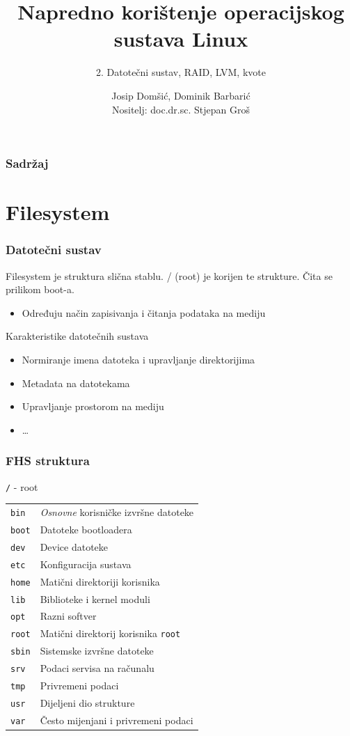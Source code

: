 \documentclass[t]{beamer}
\date{\todayiso}
\title[NKOSL]{Napredno korištenje operacijskog sustava Linux}
\author[Josip Domšić, Dominik Barbarić]{Josip Domšić, Dominik Barbarić\\ {\small Nositelj: doc.dr.sc. Stjepan Groš}}
\subtitle{2. Datotečni sustav, RAID, LVM, kvote}
\institute[FER]{Sveučilište u Zagrebu\\Fakultet elektrotehnike i računarstva}
\begin{document}
{
	\begin{frame}
		\maketitle
	\end{frame}
}

\begin{frame}
	\frametitle{Sadržaj}
	\tableofcontents
\end{frame}

\section{Filesystem}
\begin{frame}
	\frametitle{Datotečni sustav}
    Filesystem je struktura slična stablu. / (root) je korijen te strukture. Čita se prilikom boot-a.

	\begin{itemize}
		\item Određuju način zapisivanja i čitanja podataka na mediju
	\end{itemize}
	Karakteristike datotečnih sustava
	\begin{itemize}
		\item Normiranje imena datoteka i upravljanje direktorijima
		\item Metadata na datotekama
		\item Upravljanje prostorom na mediju
		\item \dots
    \end{itemize}
\end{frame}

\begin{frame}
	\frametitle{FHS struktura}
	\texttt{/} - root\\
	\begin{tabular}{p{3cm} l}
		\texttt{bin} & \emph{Osnovne} korisničke izvršne datoteke \\
		\texttt{boot} & Datoteke bootloadera \\
		\texttt{dev} & Device datoteke \\
		\texttt{etc} & Konfiguracija sustava \\
		\texttt{home} & Matični direktoriji korisnika \\
		\texttt{lib} & Biblioteke i kernel moduli \\
		\texttt{opt} & Razni softver \\
		\texttt{root} & Matični direktorij korisnika \texttt{root} \\
		\texttt{sbin} & Sistemske izvršne datoteke \\
		\texttt{srv} & Podaci servisa na računalu \\
		\texttt{tmp} & Privremeni podaci \\
		\texttt{usr} & Dijeljeni dio strukture \\
		\texttt{var} & Često mijenjani i privremeni podaci 
	\end{tabular}
\end{frame}
\end{document}
